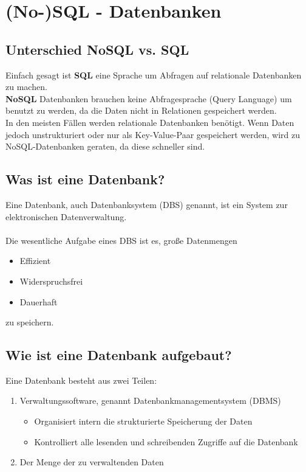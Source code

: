 \documentclass[asp1.tex]{subfiles}
\begin{document}
\section{(No-)SQL - Datenbanken}
\subsection{Unterschied NoSQL vs. SQL}
Einfach gesagt ist \textbf{SQL} eine Sprache um Abfragen auf relationale Datenbanken zu machen. \\
\textbf{NoSQL} Datenbanken brauchen keine Abfragesprache (Query Language) um benutzt zu werden, da die Daten nicht in Relationen gespeichert werden. \\
In den meisten Fällen werden relationale Datenbanken benötigt. Wenn Daten jedoch unstrukturiert oder nur als Key-Value-Paar gespeichert werden, wird zu NoSQL-Datenbanken geraten, da diese schneller sind.

\subsection{Was ist eine Datenbank?}

Eine Datenbank, auch Datenbanksystem (DBS) genannt, ist ein System zur elektronischen Datenverwaltung. \\ \\
Die wesentliche Aufgabe eines DBS ist es, große Datenmengen
\begin{itemize}
    \item Effizient
    \item Widerspruchsfrei
    \item Dauerhaft
\end{itemize}
zu speichern.

\subsection{Wie ist eine Datenbank aufgebaut?}
Eine Datenbank besteht aus zwei Teilen: \\
\begin{enumerate}
    \item Verwaltungssoftware, genannt Datenbankmanagementsystem (DBMS) \\
          \begin{itemize}
              \item Organisiert intern die strukturierte Speicherung der Daten
              \item Kontrolliert alle lesenden und schreibenden Zugriffe auf die Datenbank
          \end{itemize}
    \item Der Menge der zu verwaltenden Daten
\end{enumerate}
\end{document}
